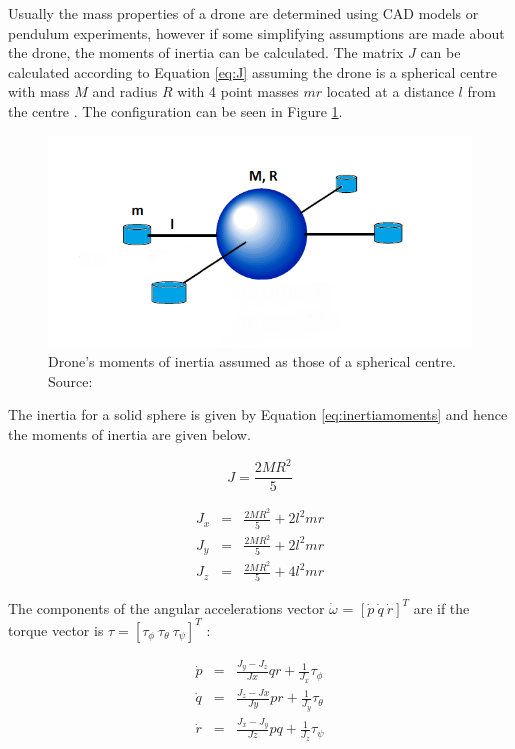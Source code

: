 Usually the mass properties of a drone are determined using CAD models or pendulum experiments, however if some simplifying assumptions are made about the drone, the moments of inertia can be calculated. The matrix $J$ can be calculated according to Equation \ref{eq:J} assuming the drone is a spherical centre with mass $M$ and radius $R$ with 4 point masses $mr$ located at a distance $l$ from the centre \cite{beard_quadrotor}. The configuration can be seen in Figure \ref{figure:sphericalcenter}.

\begin{figure}[H]
\centering
 \includegraphics[scale=0.5]{Figures/spherical.png}
 \caption{Drone's moments of inertia assumed as those of a spherical centre. Source: \cite{beard_quadrotor}}
 \label{figure:sphericalcenter}
\end{figure}

The inertia for a solid sphere is given by Equation \ref{eq:inertiamoments} and hence the moments of inertia are given below.

\begin{equation}  \label{eq:inertiamoments}
	J = \frac{2MR^2}{5}
\end{equation}

\begin{eqnarray}{}
	J_x &= & \frac{2MR^2}{5} + 2l^2mr \\
	J_y &= & \frac{2MR^2}{5} + 2l^2mr\\
	J_z &= & \frac{2MR^2}{5} + 4l^2mr 
\end{eqnarray}

The components of the angular accelerations vector $\dot{\omega}$ = $[\dot{p}\ \dot{q}\ \dot{r}]^T$ are  if the torque vector is $\tau = [\tau_\phi\ \tau_\theta\ \tau_\psi]^T$ \cite{beard_quadrotor}:

\begin{eqnarray}{}
	\dot{p} &= & \frac{J_y-J_z}{Jx}qr + \frac{1}{J_x}\tau_\phi\\
	\dot{q} &= & \frac{J_z-Jx}{Jy}pr + \frac{1}{J_y}\tau_\theta \\
	\dot{r} &= & \frac{J_x-J_y}{Jz}pq + \frac{1}{J_z}\tau_\psi 
\end{eqnarray}


